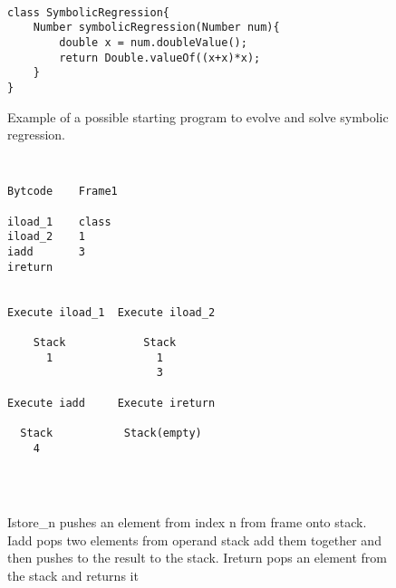 \documentclass{sig-alternate}
\begin{document}
\begin{figure}
\centering
{\tt
\begin{verbatim}
class SymbolicRegression{
    Number symbolicRegression(Number num){
        double x = num.doubleValue();
        return Double.valueOf((x+x)*x);
    }
}
\end{verbatim}
}
\caption{Example of a possible starting program to evolve and solve symbolic regression.}
\end{figure}

\begin{figure}
\centering
{\tt
\begin{verbatim}
Bytcode    Frame1  

iload_1	   class	
iload_2    1
iadd       3
ireturn


Execute iload_1  Execute iload_2   

    Stack            Stack            
      1                1               
                       3
                       
Execute iadd     Execute ireturn

  Stack           Stack(empty)
    4


          
\end{verbatim}
}
\caption{Istore\_n pushes an element from index n from frame onto stack. Iadd pops two elements from operand stack add them together and then pushes to the result to the stack. Ireturn pops an element from the stack and returns it}
\end{figure}

\end{document}
